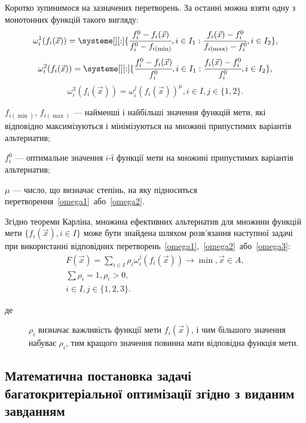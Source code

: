 Коротко зупинимося на зазначених перетворень. За останні можна взяти одну з монотонних функцій такого вигляду:
\begin{equation}\label{omega1}
\omega^1_i(f_i(\vec{x})) = \systeme[][:]{
\cfrac{f_i^0-f_i(\vec{x})}{f_i^0 - f_{i(\min)}},i \in I_1
:
\cfrac{f_i(\vec{x})-f_i^0}{f_{i(\max)} - f_i^0},i \in I_2
}
,
\end{equation}
\begin{equation}\label{omega2}
\omega^2_i(f_i(\vec{x})) = \systeme[][:]{
\cfrac{f_i^0-f_i(\vec{x})}{f_i^0},i \in I_1
:
\cfrac{f_i(\vec{x})-f_i^0}{f_i^0},i \in I_2
}
,
\end{equation}
\begin{equation}\label{omega3}
\omega^3_i(f_i(\vec{x}))=\omega^j_i(f_i(\vec{x}))^\mu, i \in I, j \in \{1,2\}
.
\end{equation}
\begin{description}
    \item[де] $f_{i(\min)}$, $f_{i(\max)}$ --- найменші і найбільші значення функцій мети, які відповідно максимізуються і мінімізуються на множині припустимих варіантів альтернатив;
    \item $f_i^0$ --- оптимальне значення $i$-ї функції мети на множині припустимих варіантів альтернатив;
    \item $\mu$ --- число, що визначає степінь, на яку підноситься перетворення~\eqref{omega1}~або~\eqref{omega2}.
\end{description}

Згідно теореми Карліна, множина ефективних альтернатив для множини функцій мети $\{f_i(\vec{x}), i \in I\}$ може бути знайдена шляхом розв’язання наступної задачі при використанні відповідних перетворень~\eqref{omega1},~\eqref{omega2}~або~\eqref{omega3}:
\begin{gather*} 
    F(\vec{x}) = \sum_{i \in I}\rho_i\omega^j_i(f_i(\vec{x})) \to \min, \vec{x} \in A, \\
    \sum \rho_i=1, \rho_i > 0, \\ 
    i \in I, j \in \{1,2,3\}.
\end{gather*}
\begin{description}
    \item[де] $\rho_i$ визначає важливість функції мети $f_i(\vec{x})$, і чим більшого значення набуває $\rho_i$, тим кращого значення повинна мати відповідна функція мети.
\end{description}

\subsection{Математична постановка задачі багатокритеріальної оптимізації згідно з виданим завданням}

